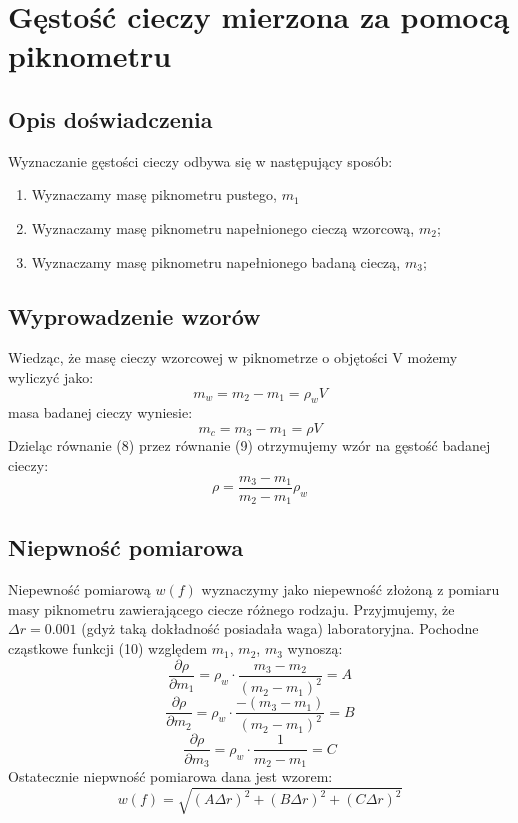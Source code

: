 \documentclass{article} %
\begin{document}
\section{Gęstość cieczy mierzona za pomocą piknometru}
\subsection{Opis doświadczenia}
Wyznaczanie gęstości cieczy odbywa się w następujący sposób:
\begin{enumerate}
    \item Wyznaczamy masę piknometru pustego, $m_1$ 
    \item Wyznaczamy masę piknometru napełnionego cieczą wzorcową, $m_2$;
    \item Wyznaczamy masę piknometru napełnionego badaną cieczą, $m_3$;
\end{enumerate}
\subsection{Wyprowadzenie wzorów}
Wiedząc, że masę cieczy wzorcowej w piknometrze o objętości V możemy
wyliczyć jako:
\begin{equation}
    m_w = m_2 - m_1 = \rho_wV
\end{equation}
masa badanej cieczy wyniesie:
\begin{equation}
    m_c = m_3 - m_1 = \rho V
\end{equation}
Dzieląc równanie (8) przez równanie (9) otrzymujemy wzór na gęstość badanej cieczy:
\begin{equation}
    \rho = \frac{m_3 - m_1}{m_2 - m_1}\rho_w
\end{equation}
\subsection{Niepwność pomiarowa}
Niepewność pomiarową $w(f)$ wyznaczymy jako niepewność złożoną z pomiaru masy piknometru zawierającego ciecze różnego rodzaju. Przyjmujemy, że $\Delta r = 0.001$ (gdyż taką dokładność posiadała waga) laboratoryjna. Pochodne cząstkowe funkcji (10) względem $m_1$, $m_2$, $m_3$ wynoszą:
\begin{equation}
    \frac{\partial \rho}{\partial m_1} = \rho_w \cdot \frac{m_3 - m_2}{(m_2 - m_1)^2} = A
\end{equation}
\begin{equation}
    \frac{\partial \rho}{\partial m_2} = \rho_w \cdot \frac{-(m_3 - m_1)}{(m_2 - m_1)^2} = B   
\end{equation}
\begin{equation}
    \frac{\partial \rho}{\partial m_3} = \rho_w \cdot \frac{1}{m_2 - m_1} = C
\end{equation}
Ostatecznie niepwność pomiarowa dana jest wzorem:
{\large
    \begin{equation}
        w(f)=\sqrt{(A\Delta r)^2+(B\Delta r)^2+(C\Delta r)^2}
    \end{equation}
}
\end{document}
